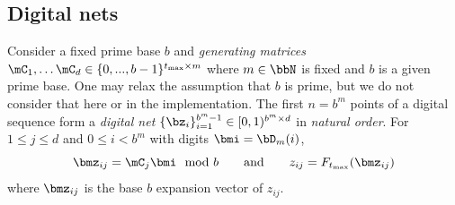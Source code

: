 \documentclass[acmsmall]{acmart}
\begin{document}
\subsection{Digital nets} 

Consider a fixed prime base $b$ and \emph{generating matrices} $\mC_1,\dots\mC_d \in \{0,...,b-1\}^{t_\mathrm{max} \times m}$ where $m \in \bbN$ is fixed and $b$ is a given prime base. One may relax the assumption that $b$ is prime, but we do not consider that here or in the implementation. The first $n=b^m$ points of a digital sequence form a \emph{digital net} $\{\bz_i\}_{i=1}^{b^m-1} \in [0,1)^{b^m \times d}$ in \emph{natural order}. For $1 \leq j \leq d$ and $0 \leq i < b^m$ with digits $\bmi = \bD_m(i)$,
$$\bmz_{ij} = \mC_j \bmi \mod b \qquad\text{and}\qquad z_{ij} = F_{t_\mathrm{max}}(\bmz_{ij})$$
where $\bmz_{ij}$ is the base $b$ expansion vector of $z_{ij}$. 
\end{document}
